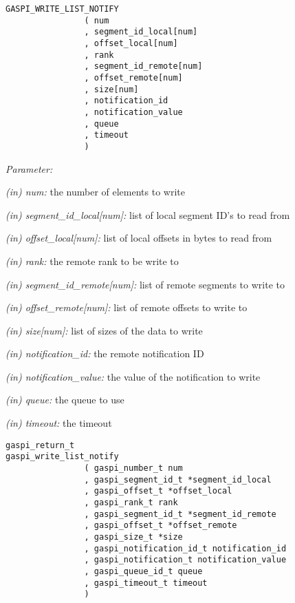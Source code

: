 \documentclass[a4paper]{article}
\newlength{\st}\setlength{\st}{0pt}
\newcommand{\parameter}[1]{{\it #1}}
\newenvironment{cbox}[1]
{\newcommand\colboxcolor{#1}\begin{lrbox}{\riddlebox}\begin{minipage}{\dimexpr\columnwidth-2\fboxsep\relax}}
{\end{minipage}\end{lrbox}\begin{center}\colorbox[HTML]{\colboxcolor}{\usebox{\riddlebox}}\end{center}}
\newcommand{\shortlistbegin}[1]{\begin{trivlist}\setlength{\itemsep}{0pt}\item[]\emph{#1:}}
\newcommand{\shortlistitem}[1]{\item[]#1}
\newcommand{\shortlistend}{\end{trivlist}}
\newenvironment{FDef}{\begin{trivlist}\item[]}{\end{trivlist}}
\newenvironment{FDefSign}{\begin{cbox}{EEEEEE}}{\end{cbox}}
\newcommand{\parameterlistbegin}{\shortlistbegin{Parameter}}
\newcommand{\parameterlistend}{\shortlistend}
\newcommand{\parameterlistitem}[3]{\shortlistitem{\parameter{(#1) #2:} {#3}}}
\begin{document}
\begin{FDef}
\begin{FDefSign}
\begin{verbatim}
GASPI_WRITE_LIST_NOTIFY
                ( num
                , segment_id_local[num]
                , offset_local[num]
                , rank
                , segment_id_remote[num]
                , offset_remote[num]
                , size[num]
                , notification_id
                , notification_value
                , queue
                , timeout
                )
\end{verbatim}
\end{FDefSign}

\parameterlistbegin
\parameterlistitem{in}{num}{the number of elements to write}
\parameterlistitem{in}{segment\_id\_local[num]}{list of local segment ID's to read from}
\parameterlistitem{in}{offset\_local[num]}{list of local offsets in bytes to read from}
\parameterlistitem{in}{rank}{the remote rank to be write to}
\parameterlistitem{in}{segment\_id\_remote[num]}{list of remote segments to write to}
\parameterlistitem{in}{offset\_remote[num]}{list of remote offsets to write to}
\parameterlistitem{in}{size[num]}{list of sizes of the data to write}
\parameterlistitem{in}{notification\_id}{the remote notification ID}
\parameterlistitem{in}{notification\_value}{the value of the notification to write}
\parameterlistitem{in}{queue}{the queue to use}
\parameterlistitem{in}{timeout}{the timeout}
\parameterlistend


\begin{FDefSign}
\begin{verbatim}
gaspi_return_t
gaspi_write_list_notify
                ( gaspi_number_t num
                , gaspi_segment_id_t *segment_id_local
                , gaspi_offset_t *offset_local
                , gaspi_rank_t rank
                , gaspi_segment_id_t *segment_id_remote
                , gaspi_offset_t *offset_remote
                , gaspi_size_t *size
                , gaspi_notification_id_t notification_id
                , gaspi_notification_t notification_value
                , gaspi_queue_id_t queue
                , gaspi_timeout_t timeout
                )
\end{verbatim}
\end{FDefSign}



\end{FDef}
\end{document}
